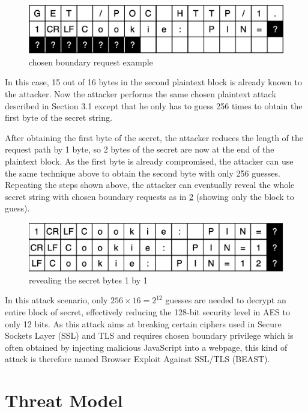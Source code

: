 \documentclass{acm_proc_article-sp}
\begin{document}
\begin{figure}[htb]
    \centering
    \includegraphics[keepaspectratio, width=\linewidth]{./figures/request-example.png}
    \caption{chosen boundary request example}
    \label{fig:req-example}
\end{figure}
In this case, 15 out of 16 bytes in the second plaintext block is
already known to the attacker. Now the attacker performs the same chosen plaintext attack
described in Section 3.1 except that he only has to guess 256 times to obtain the first byte of the
secret string.

After obtaining the first byte of the secret, the attacker reduces the length of the request path by 1
byte, so 2 bytes of the secret are now at the end of the plaintext block. As the first byte is already
compromised, the attacker can use the same technique above to obtain the second byte with only
256 guesses. Repeating the steps shown above, the attacker can eventually reveal the whole secret
string with chosen boundary requests as in \ref{fig:reveal} (showing only the block to guess).
\begin{figure}[htb]
    \centering
    \includegraphics[keepaspectratio, width=\linewidth]{./figures/revealing.png}
    \caption{revealing the secret bytes 1 by 1}
    \label{fig:reveal}
\end{figure}

In this attack scenario, only $256\times16 = 2^{12}$ guesses are needed to decrypt an entire block 
of secret, effectively reducing the 128-bit security level in AES to only 12 bits. As this attack aims at
breaking certain ciphers used in Secure Sockets Layer (SSL) and TLS and requires chosen
boundary privilege which is often obtained by injecting malicious JavaScript into a webpage,
this kind of attack is therefore named Browser Exploit Against SSL/TLS (BEAST).

\section{Threat Model}
\end{document}
